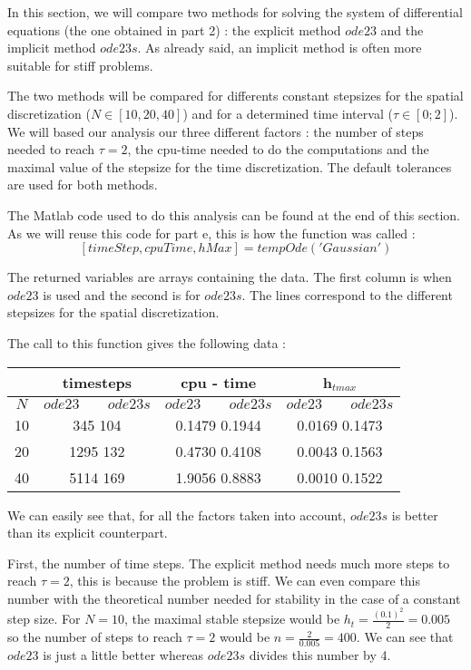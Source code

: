 In this section, we will compare two methods for solving the system of differential equations (the one obtained in part 2) : the explicit method $ode23$ and the implicit method $ode23s$. As already said, an implicit method is often more suitable for stiff problems.

The two methods will be compared for differents constant stepsizes for the spatial discretization ($N \in [10,20,40]$) and for a determined time interval ($\tau \in [0;2]$). We will based our analysis our three different factors : the number of steps needed to reach $\tau = 2$, the cpu-time needed to do the computations and the maximal value of the stepsize for the time discretization. The default tolerances are used for both methods.

The Matlab code used to do this analysis can be found at the end of this section. As we will reuse this code for part e, this is how the function was called : 
$$[timeStep,cpuTime,hMax] = tempOde('Gaussian')$$

The returned variables are arrays containing the data. The first column is when $ode23$ is used and the second is for $ode23s$. The lines correspond to the different stepsizes for the spatial discretization.

The call to this function gives the following data : 

\begin{center}
\begin{tabular}{|c|c|c|c|}
\hline 
  & \textbf{timesteps} & \textbf{cpu - time} & \textbf{h}$_{tmax}$ \\ 
\hline 
$N$ & $ode23 \phantom{fedz} ode23s$ & $ode23 \phantom{fedz} ode23s$ & $ode23 \phantom{fedz} ode23s$ \\ 
\hline 
10 &345 \phantom{fedzf} 104  & 0.1479 \phantom{fedz}    0.1944 &  0.0169  \phantom{fedz}  0.1473 \\ 
\hline 
20 & 1295 \phantom{fedz} 132 & 0.4730  \phantom{fedz}  0.4108 & 0.0043  \phantom{fedz}  0.1563 \\ 
\hline 
40 & 5114 \phantom{fedz} 169 &1.9056 \phantom{fedz}   0.8883  & 0.0010  \phantom{fedz}  0.1522 \\ 
\hline 
\end{tabular} 
\end{center}


We can easily see that, for all the factors taken into account, $ode23s$ is better than its explicit counterpart. 

First, the number of time steps. The explicit method needs much more steps to reach $\tau = 2$, this is because the problem is stiff. We can even compare this number with the theoretical number needed for stability in the case of a constant step size. For $N=10$, the maximal stable stepsize would be $h_t = \frac{(0.1)^2}{2} = 0.005$ so the number of steps to reach $\tau=2$ would be $n = \frac{2}{0.005} = 400$. We can see that $ode23$ is just a little better whereas $ode23s$ divides this number by 4.

